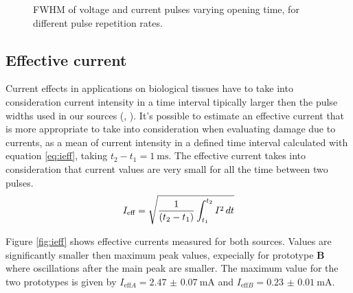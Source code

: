 \begin{figure}
 \centering
 \hfill
 \caption{FWHM of voltage and current pulses varying opening time, for different pulse repetition rates.}
 \label{fig:times}
\end{figure}


\subsection{Effective current}
Current effects in applications on biological tissues have to take into consideration current intensity in a time interval tipically larger then the pulse widths used in our sources (\cite{doi:10.1002/ppap.200731208}, \cite{unipd:ceciliaDBD}). It's possible to estimate an effective current that is more appropriate to take into consideration when evaluating damage due to currents, as a mean of current intensity in a defined time interval calculated with equation \ref{eq:ieff}, taking $t_2-t_1 = \SI{1}{\milli\second}$. The effective current takes into consideration that current values are very small for all the time between two pulses.
\begin{equation}
 \centering
 I_{\text{eff}} = \sqrt{\frac{1}{(t_2-t_1)}\int_{t_1}^{t_2} I^2 \,dt}
 \label{eq:ieff}
\end{equation}

Figure \ref{fig:ieff} shows effective currents measured for both sources. Values are significantly smaller then maximum peak values, expecially for prototype \textbf{B} where oscillations after the main peak are smaller. The maximum value for the two prototypes is given by $I_{\text{eff} A} = \SI{2.47(7)}{\milli\ampere}$ and $I_{\text{eff} B} = \SI{0.23(1)}{\milli\ampere}$.

